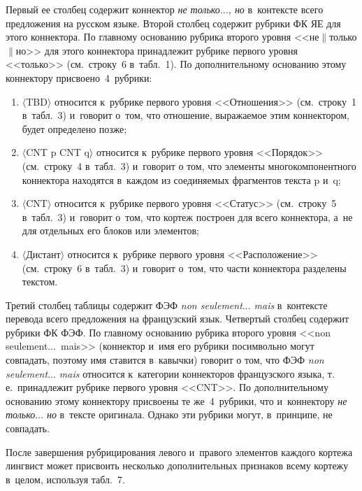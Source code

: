\begin{multicols}{2}
  Первый ее столбец содержит коннектор \textit{не только$\ldots$, но} 
в~контексте всего предложения на русском языке. Второй столбец содержит 
рубрики ФК ЯЕ для этого коннектора. По главному основанию рубрика 
второго уровня <<не$\|$только$\|$но>> для этого коннектора принадлежит 
рубрике первого уровня <<только>> (см.\ строку~6 в~табл.~1). По 
дополнительному основанию этому коннектору присвоено~4~руб\-рики:
  \begin{enumerate}[(1)]
\item $\langle$TBD$\rangle$ относится к~рубрике первого уровня <<Отношения>> 
(см.\ строку~1 в~табл.~3) и~говорит о~том, что отношение, выражаемое 
этим коннектором, будет определено позже;
\item $\langle$CNT p CNT q$\rangle$ относится к~рубрике первого уровня 
<<Порядок>> (см.\ строку~4 в~табл.~3) и~говорит о том, что элементы 
многокомпонентного коннектора находятся в~каждом из соединяемых 
фрагментов текста p и~q;
\item $\langle$CNT$\rangle$ относится к~рубрике первого уровня <<Статус>> (см.\ 
строку~5 в~табл.~3) и~говорит о~том, что кортеж построен для всего 
коннектора, а~не для отдельных его блоков или элементов;
\item $\langle$Дистант$\rangle$ относится к~рубрике первого уровня 
<<Расположение>> (см.\ строку~6 в~табл.~3) и~говорит о~том, что части 
коннектора разделены текстом.
\end{enumerate}

  Третий столбец таблицы содержит ФЭФ \textit{non seulement$\ldots$ mais} 
в~контексте перевода всего предложения на французский язык. Четвертый 
столбец содержит рубрики ФК ФЭФ. По главному основанию рубрика 
второго уровня <<non seulement$\ldots$\ mais>> (коннектор и~имя его 
рубрики посимвольно могут совпадать, поэтому имя ставится в~кавычки) 
говорит о том, что ФЭФ \textit{non seulement$\ldots$ mais} относится 
к~категории коннекторов французского языка, т.\,е.\ принадлежит рубрике 
первого уровня <<CNT>>. По дополнительному основанию этому 
коннектору присвоены те же~4~рубрики, что и~коннектору \textit{не 
только$\ldots$ но} в~тексте оригинала. Однако эти рубрики могут, 
в~принципе, не совпадать.
  
  После завершения рубрицирования левого и~правого элементов каждого 
кортежа лингвист может присвоить несколько дополнительных признаков 
всему кортежу в~целом, используя табл.~7.
  
\vspace*{-6pt}


\end{multicols}
